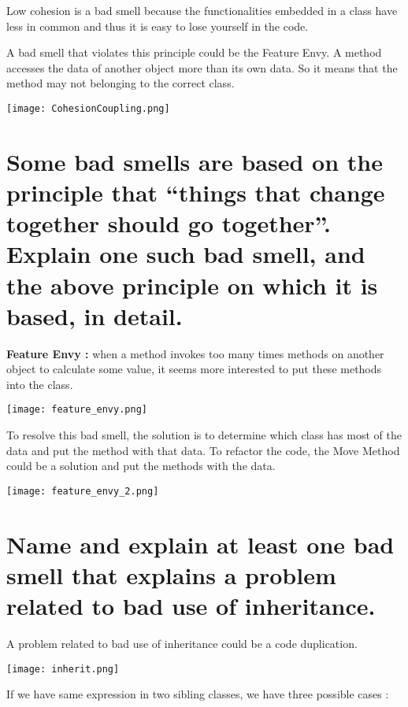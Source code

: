 Low cohesion is a bad smell because the functionalities embedded in a class have less in common and thus it is easy to lose yourself in the code.\newline

A bad smell that violates this principle could be  the Feature Envy. A method accesses the data of another object more than its own data.  So it means that the method may not belonging to the correct class.

\begin{center}
\texttt{[image: CohesionCoupling.png]}
\end{center}

\section{Some bad smells are based on the principle that “things that change together should go together”. Explain one such bad smell, and the above principle on which it is based, in detail.}

\textbf{Feature Envy : } when a method invokes too many times methods on another object to calculate some value, it seems more interested to put these methods into the class.

\begin{center}
\texttt{[image: feature\_envy.png]}
\end{center}

To resolve this bad smell, the solution is to determine which class has most of the data and put the method with that data. To refactor the code, the Move Method could be a solution and put the methods with the data.

\begin{center}
\texttt{[image: feature\_envy\_2.png]}
\end{center}



\section{Name and explain at least one bad smell that explains a problem related to bad use of inheritance.}

A problem related to bad use of inheritance could be a code duplication.

\begin{center}
\texttt{[image: inherit.png]}
\end{center}

If we have same expression in two sibling classes, we have three possible cases : 

